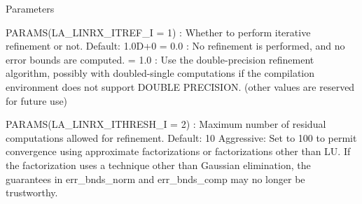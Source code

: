 \begin{DoxyParams}[1]{Parameters}
\begin{DoxyVerb}
       PARAMS(LA_LINRX_ITREF_I = 1) : Whether to perform iterative
            refinement or not.
         Default: 1.0D+0
            = 0.0 : No refinement is performed, and no error bounds are
                    computed.
            = 1.0 : Use the double-precision refinement algorithm,
                    possibly with doubled-single computations if the
                    compilation environment does not support DOUBLE
                    PRECISION.
              (other values are reserved for future use)

       PARAMS(LA_LINRX_ITHRESH_I = 2) : Maximum number of residual
            computations allowed for refinement.
         Default: 10
         Aggressive: Set to 100 to permit convergence using approximate
                     factorizations or factorizations other than LU. If
                     the factorization uses a technique other than
                     Gaussian elimination, the guarantees in
                     err_bnds_norm and err_bnds_comp may no longer be
                     trustworthy.


\end{DoxyVerb}
\end{DoxyParams}

